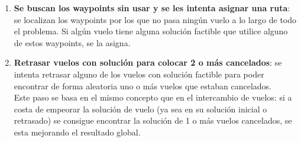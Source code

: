 \begin{enumerate}
	\item \textbf{Se buscan los waypoints sin usar y se les intenta asignar una ruta}: se localizan los waypoints por los que no pasa ningún vuelo a lo largo de todo el problema. Si algún vuelo tiene alguna solución factible que utilice alguno de estos waypoints, se la asigna. \\
	
	
	\item \textbf{Retrasar vuelos con solución para colocar 2 o más cancelados}: se intenta retrasar alguno de los vuelos con solución factible para poder encontrar de forma aleatoria uno o más vuelos que estaban cancelados.\\
	Este paso se basa en el mismo concepto que en el intercambio de vuelos: si a costa de empeorar la solución de vuelo (ya sea en su solución inicial o retrasado) se consigue encontrar la solución de 1 o más vuelos cancelados, se esta mejorando el resultado global.
	
\end{enumerate}
